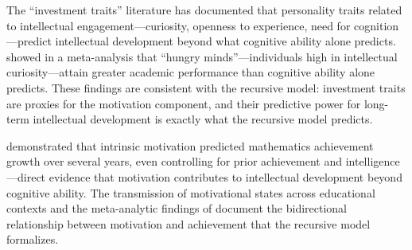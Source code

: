 \documentclass[12pt,a4paper]{article}
\begin{document}
The ``investment traits'' literature \citep{Ziegler2012,vonStummAckerman2013} has documented that personality traits related to intellectual engagement---\hspace{0pt}curiosity, openness to experience, need for cognition---\hspace{0pt}predict intellectual development beyond what cognitive ability alone predicts.  showed in a meta-analysis that ``hungry minds''---\hspace{0pt}individuals high in intellectual curiosity---\hspace{0pt}attain greater academic performance than cognitive ability alone predicts. These findings are consistent with the recursive model: investment traits are proxies for the motivation component, and their predictive power for long-term intellectual development is exactly what the recursive model predicts.

\citet{Murayama2013} demonstrated that intrinsic motivation predicted mathematics achievement growth over several years, even controlling for prior achievement and intelligence---\hspace{0pt}direct evidence that motivation contributes to intellectual development beyond cognitive ability. The transmission of motivational states across educational contexts \citep{Schiefele2017} and the meta-analytic findings of \citet{Vu2024} document the bidirectional relationship between motivation and achievement that the recursive model formalizes.
\end{document}
